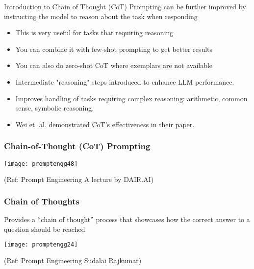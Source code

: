 \begin{frame}[fragile]{Introduction to Chain of Thought (CoT)}
Prompting can be further improved by instructing the 
model to reason about the task when responding

    \begin{itemize}
		\item This is very useful for tasks that requiring reasoning 
		\item You can combine it with few-shot prompting to get better results 
		\item You can also do zero-shot CoT where exemplars are not available	
        \item Intermediate "reasoning" steps introduced to enhance LLM performance.
        \item Improves handling of tasks requiring complex reasoning: arithmetic, common sense, symbolic reasoning.
        \item Wei et. al. demonstrated CoT's effectiveness in their paper.
    \end{itemize}
\end{frame}

\begin{frame}[fragile]\frametitle{Chain-of-Thought (CoT) Prompting}

\begin{center}
\texttt{[image: promptengg48]}

{\tiny (Ref: Prompt Engineering A lecture by DAIR.AI)}

\end{center}	

\end{frame}



\begin{frame}[fragile]\frametitle{Chain of Thoughts}

Provides a “chain of thought” process that 
showcases how the correct answer to a question should be reached

\begin{center}
\texttt{[image: promptengg24]}

{\tiny (Ref: Prompt Engineering Sudalai Rajkumar)}

\end{center}		

\end{frame}

